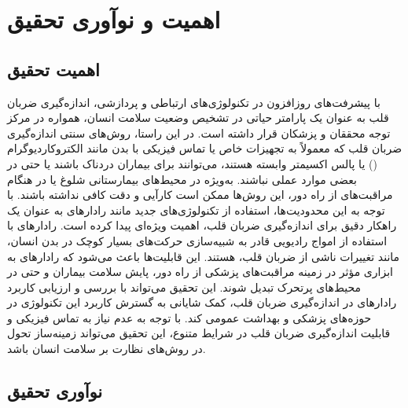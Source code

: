 \section{اهمیت و نوآوری تحقیق}\label{sec1}
\subsection{اهمیت تحقیق}\label{sec1}

با پیشرفت‌های روزافزون در تکنولوژی‌های ارتباطی و پردازشی، اندازه‌گیری ضربان قلب به عنوان یک پارامتر حیاتی در تشخیص وضعیت سلامت انسان، همواره در مرکز توجه محققان و پزشکان قرار داشته است. در این راستا، روش‌های سنتی اندازه‌گیری ضربان قلب که معمولاً به تجهیزات خاص یا تماس فیزیکی با بدن مانند الکتروکاردیوگرام () یا پالس اکسیمتر وابسته هستند، می‌توانند برای بیماران دردناک باشند یا حتی در بعضی موارد عملی نباشند. به‌ویژه در محیط‌های بیمارستانی شلوغ یا در هنگام مراقبت‌های از راه دور، این روش‌ها ممکن است کارآیی و دقت کافی نداشته باشند.
با توجه به این محدودیت‌ها، استفاده از تکنولوژی‌های جدید مانند رادارهای  به عنوان یک راهکار دقیق برای اندازه‌گیری ضربان قلب، اهمیت ویژه‌ای پیدا کرده است. رادارهای  با استفاده از امواج رادیویی قادر به شبیه‌سازی حرکت‌های بسیار کوچک در بدن انسان، مانند تغییرات ناشی از ضربان قلب، هستند. این قابلیت‌ها باعث می‌شود که رادارهای  به ابزاری مؤثر در زمینه مراقبت‌های پزشکی از راه دور، پایش سلامت بیماران و حتی در محیط‌های پرتحرک تبدیل شوند.
این تحقیق می‌تواند با بررسی و ارزیابی کاربرد رادارهای  در اندازه‌گیری ضربان قلب، کمک شایانی به گسترش کاربرد این تکنولوژی در حوزه‌های پزشکی و بهداشت عمومی کند. با توجه به عدم نیاز به تماس فیزیکی و قابلیت اندازه‌گیری ضربان قلب در شرایط متنوع، این تحقیق می‌تواند زمینه‌ساز تحول در روش‌های نظارت بر سلامت انسان باشد.

\subsection{نوآوری تحقیق}\label{sec2}


